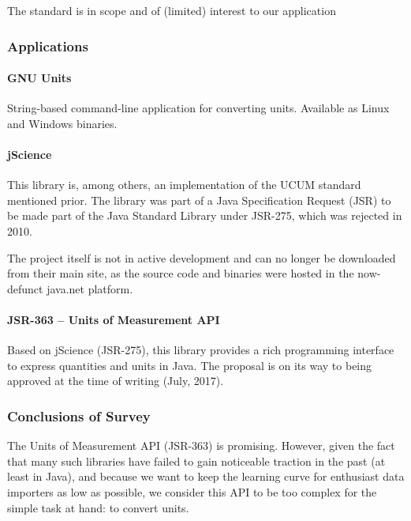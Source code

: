 The standard is in scope and of (limited) interest to our application

\subsubsection{Applications}\label{applications}

\paragraph{GNU Units}\label{gnu-units}

String-based command-line application for converting units. Available as
Linux and Windows binaries.

\paragraph{jScience}\label{jscience}

This library is, among others, an implementation of the UCUM standard
mentioned prior. The library was part of a Java Specification Request
(JSR) to be made part of the Java Standard Library under JSR-275, which
was rejected in 2010.

The project itself is not in active development and can no longer be
downloaded from their main site, as the source code and binaries were
hosted in the now-defunct java.net platform.

\paragraph{JSR-363 -- Units of Measurement
API}\label{jsr-363-units-of-measurement-api}

Based on jScience (JSR-275), this library provides a rich programming
interface to express quantities and units in Java. The proposal is on
its way to being approved at the time of writing (July, 2017).

\subsubsection{Conclusions of Survey}\label{conclusions-of-survey}

The Units of Measurement API (JSR-363) is promising. However, given the
fact that many such libraries have failed to gain noticeable traction in
the past (at least in Java), and because we want to keep the learning
curve for enthusiast data importers as low as possible, we consider this
API to be too complex for the simple task at hand: to convert units.

